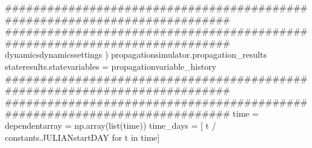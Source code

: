 {}###########################################################################\markdownRendererInterblockSeparator
{}
\markdownRendererSectionEnd \markdownRendererSectionBegin
{}\markdownRendererInterblockSeparator
{}###########################################################################\markdownRendererInterblockSeparator
{}
\markdownRendererSectionEnd \markdownRendererSectionBegin
{}\markdownRendererInterblockSeparator
{}dynamicsdynamicssettings )\markdownRendererInterblockSeparator
{}
\markdownRendererSectionEnd \markdownRendererSectionBegin
{}\markdownRendererInterblockSeparator
{}propagationsimulator.propagation_results\markdownRendererInterblockSeparator
{}
\markdownRendererSectionEnd \markdownRendererSectionBegin
{}\markdownRendererInterblockSeparator
{}stateresults.statevariables = propagationvariable_history\markdownRendererInterblockSeparator
{}###########################################################################\markdownRendererInterblockSeparator
{}
\markdownRendererSectionEnd \markdownRendererSectionBegin
{}\markdownRendererInterblockSeparator
{}########################################################################### time = dependentarray = np.array(list(time)) time_days = [ t / constants.JULIANstartDAY for t in time]\markdownRendererInterblockSeparator
{}
\markdownRendererSectionEnd \markdownRendererSectionBegin
{}\markdownRendererInterblockSeparator
{}
\markdownRendererSectionEnd \markdownRendererSectionBegin
{}\markdownRendererInterblockSeparator
{}
\markdownRendererSectionEnd \markdownRendererSectionBegin
{}\markdownRendererInterblockSeparator
